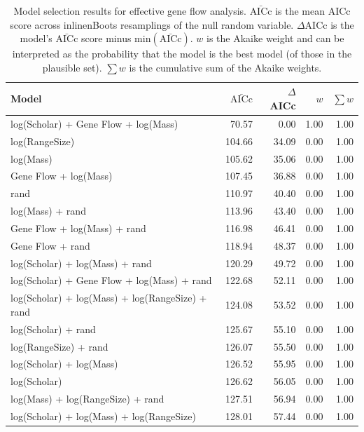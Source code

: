 \begin{table}[ht]
\centering
\caption[
  Full model selection results for effective gene flow analysis. 
]{
  Model selection results for effective gene flow analysis. 
  $\bar{\text{AICc}}$ is the mean AICc score across 
inline{nBoots} resamplings of the null random variable. 
  $\Delta$AICc is the model's $\bar{\text{AICc}}$ score minus $\text{min}(\bar{\text{AICc}})$. 
  $w$ is the Akaike weight and can be interpreted as the probability that the model is the best model (of those in the plausible set).
  $\sum w$ is the cumulative sum of the Akaike weights.
  } 
\label{A-fstModelWeights}
\begingroup\scriptsize
\begin{tabular}{@{}lrrrr@{}}
  \toprule
Model & $\bar{\text{AICc}}$ & $\Delta$AICc & $w$ & $\sum w$ \\ 
  \midrule
log(Scholar) + Gene Flow + log(Mass) & 70.57 & 0.00 & 1.00 & 1.00 \\ 
  log(RangeSize) & 104.66 & 34.09 & 0.00 & 1.00 \\ 
  log(Mass) & 105.62 & 35.06 & 0.00 & 1.00 \\ 
  Gene Flow + log(Mass) & 107.45 & 36.88 & 0.00 & 1.00 \\ 
  rand & 110.97 & 40.40 & 0.00 & 1.00 \\ 
  log(Mass) + rand & 113.96 & 43.40 & 0.00 & 1.00 \\ 
  Gene Flow + log(Mass) + rand & 116.98 & 46.41 & 0.00 & 1.00 \\ 
  Gene Flow + rand & 118.94 & 48.37 & 0.00 & 1.00 \\ 
  log(Scholar) + log(Mass) + rand & 120.29 & 49.72 & 0.00 & 1.00 \\ 
  log(Scholar) + Gene Flow + log(Mass) + rand & 122.68 & 52.11 & 0.00 & 1.00 \\ 
  log(Scholar) + log(Mass) + log(RangeSize) + rand & 124.08 & 53.52 & 0.00 & 1.00 \\ 
  log(Scholar) + rand & 125.67 & 55.10 & 0.00 & 1.00 \\ 
  log(RangeSize) + rand & 126.07 & 55.50 & 0.00 & 1.00 \\ 
  log(Scholar) + log(Mass) & 126.52 & 55.95 & 0.00 & 1.00 \\ 
  log(Scholar) & 126.62 & 56.05 & 0.00 & 1.00 \\ 
  log(Mass) + log(RangeSize) + rand & 127.51 & 56.94 & 0.00 & 1.00 \\ 
  log(Scholar) + log(Mass) + log(RangeSize) & 128.01 & 57.44 & 0.00 & 1.00 \\ 

\end{tabular}
\end{table}
